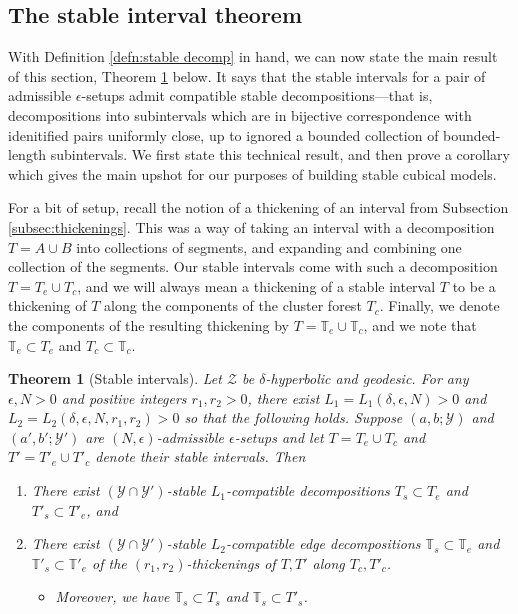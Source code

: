 \documentclass{amsart}
\newtheorem{theorem}{Theorem}[section]
\theoremstyle{definition}
\theoremstyle{remark}
\theoremstyle{definition}
\newcommand{\calY}{\mathcal{Y}}
\newcommand{\calZ}{\mathcal{Z}}
\newcommand{\bT}{\mathbb{T}}
\begin{document}
\subsection{The stable interval theorem}

With Definition \ref{defn:stable decomp} in hand, we can now state the main result of this section, Theorem \ref{thm:stable intervals} below.  It says that the stable intervals for a pair of admissible $\epsilon$-setups admit compatible stable decompositions---that is, decompositions into subintervals which are in bijective correspondence with idenitified pairs uniformly close, up to ignored a bounded collection of bounded-length subintervals.  We first state this technical result, and then prove a corollary which gives the main upshot for our purposes of building stable cubical models.  

For a bit of setup, recall the notion of a thickening of an interval from Subsection \ref{subsec:thickenings}.  This was a way of taking an interval with a decomposition $T = A \cup B$ into collections of segments, and expanding and combining one collection of the segments.  Our stable intervals come with such a decomposition $T = T_e \cup T_c$, and we will always mean a thickening of a stable interval $T$ to be a thickening of $T$ along the components of the cluster forest $T_c$.  Finally, we denote the components of the resulting thickening by $T = \bT_{e} \cup \bT_c$, and we note that $\bT_e \subset T_e$ and $T_c \subset \bT_c$. 

\begin{theorem}[Stable intervals]\label{thm:stable intervals}
Let $\calZ$ be $\delta$-hyperbolic and geodesic.  For any $\epsilon, N>0$ and positive integers $r_1,r_2>0$, there exist $L_1 = L_1(\delta, \epsilon, N)>0$ and $L_2 = L_2(\delta, \epsilon, N,r_1,r_2)>0$ so that the following holds.  Suppose $(a,b;\calY)$ and $(a',b';\calY')$ are $(N,\epsilon)$-admissible $\epsilon$-setups and let $T = T_e \cup T_c$ and $T' = T'_e \cup T'_c$ denote their stable intervals.  Then
\begin{enumerate}
\item There exist $(\calY \cap \calY')$-stable $L_1$-compatible decompositions $T_s \subset T_e$ and $T'_s \subset T'_e$, and
\item There exist $(\calY \cap \calY')$-stable $L_2$-compatible edge decompositions $\bT_{s} \subset \bT_{e}$ and $\bT'_{s} \subset \bT'_{e}$ of the $(r_1,r_2)$-thickenings of $T, T'$ along $T_c,T'_c$.
\begin{itemize}
\item Moreover, we have $\bT_s \subset T_s$ and $\bT_s \subset T'_s$.
\end{itemize}
\end{enumerate}

\end{theorem}
\end{document}
